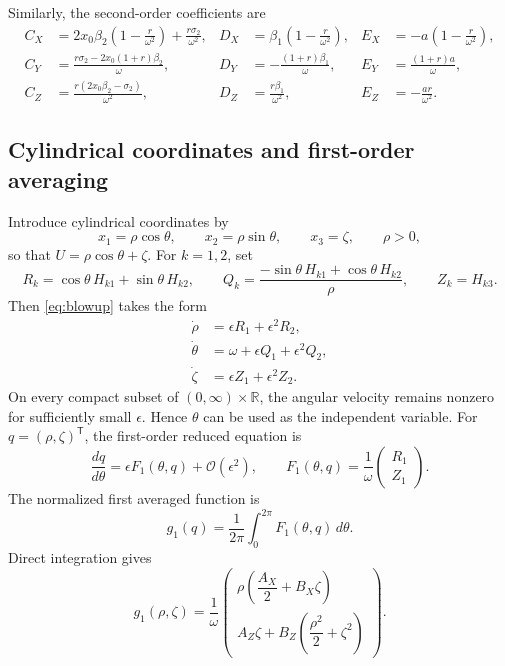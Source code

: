 \documentclass[11pt]{amsart}
\theoremstyle{remark}
\newcommand{\R}{\mathbb{R}}
\newcommand{\cO}{\mathcal{O}}
\begin{document}
Similarly, the second-order coefficients are
\begin{equation}\label{eq:second-order-coefficients}
\begin{aligned}
C_X&=2x_0\beta_2\left(1-\frac r{\omega^2}\right)
     +\frac{r\sigma_2}{\omega^2},
&
D_X&=\beta_1\left(1-\frac r{\omega^2}\right),
&
E_X&=-a\left(1-\frac r{\omega^2}\right),\\
C_Y&=\frac{r\sigma_2-2x_0(1+r)\beta_2}{\omega},
&
D_Y&=-\frac{(1+r)\beta_1}{\omega},
&
E_Y&=\frac{(1+r)a}{\omega},\\
C_Z&=\frac{r(2x_0\beta_2-\sigma_2)}{\omega^2},
&
D_Z&=\frac{r\beta_1}{\omega^2},
&
E_Z&=-\frac{ar}{\omega^2}.
\end{aligned}
\end{equation}

\subsection{Cylindrical coordinates and first-order averaging}

Introduce cylindrical coordinates by
\[
 x_1=\rho\cos\theta,\qquad x_2=\rho\sin\theta,\qquad x_3=\zeta,
 \qquad \rho>0,
\]
so that \(U=\rho\cos\theta+\zeta\).  For \(k=1,2\), set
\[
 R_k=\cos\theta\,H_{k1}+\sin\theta\,H_{k2},\qquad
 Q_k=\frac{-\sin\theta\,H_{k1}+\cos\theta\,H_{k2}}{\rho},
 \qquad Z_k=H_{k3}.
\]
Then \eqref{eq:blowup} takes the form
\begin{equation}\label{eq:cylindrical}
\begin{aligned}
\dot{\rho}&=\epsilon R_1+\epsilon^2R_2,\\
\dot{\theta}&=\omega+\epsilon Q_1+\epsilon^2Q_2,\\
\dot{\zeta}&=\epsilon Z_1+\epsilon^2Z_2.
\end{aligned}
\end{equation}
On every compact subset of \((0,\infty)\times\R\), the angular velocity
remains nonzero for sufficiently small \(\epsilon\).  Hence \(\theta\) can
be used as the independent variable.  For
\(q=(\rho,\zeta)^{\mathsf T}\), the first-order reduced equation is
\begin{equation}\label{eq:first-order-reduced}
\frac{dq}{d\theta}
=\epsilon F_1(\theta,q)+\cO(\epsilon^2),
\qquad
F_1(\theta,q)=\frac1\omega
\begin{pmatrix}R_1\\Z_1\end{pmatrix}.
\end{equation}
The normalized first averaged function is
\[
 g_1(q)=\frac1{2\pi}\int_0^{2\pi}F_1(\theta,q)\,d\theta.
\]
Direct integration gives
\begin{equation}\label{eq:g1}
g_1(\rho,\zeta)=\frac1\omega
\begin{pmatrix}
\rho\left(\dfrac{A_X}{2}+B_X\zeta\right)\\[2mm]
A_Z\zeta+B_Z\left(\dfrac{\rho^2}{2}+\zeta^2\right)
\end{pmatrix}.
\end{equation}
\end{document}
